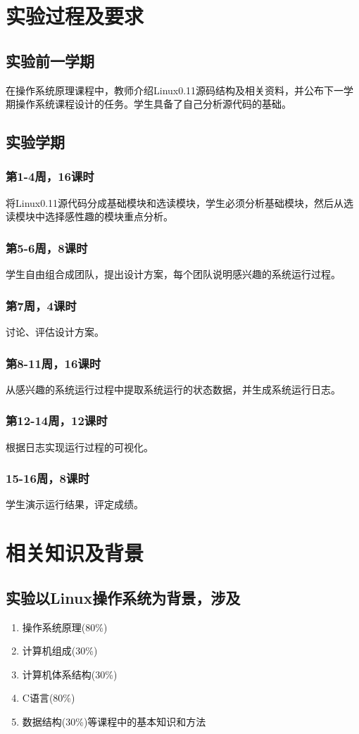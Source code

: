 \documentclass[]{report}
\begin{document}
\chapter{实验过程及要求}

\section{实验前一学期}

在操作系统原理课程中，教师介绍Linux0.11源码结构及相关资料，并公布下一学期操作系统课程设计的任务。学生具备了自己分析源代码的基础。

\section{实验学期}

\subsection{第1-4周，16课时}
将Linux0.11源代码分成基础模块和选读模块，学生必须分析基础模块，然后从选读模块中选择感性趣的模块重点分析。
\subsection{第5-6周，8课时}
学生自由组合成团队，提出设计方案，每个团队说明感兴趣的系统运行过程。
\subsection{第7周，4课时}
讨论、评估设计方案。
\subsection{第8-11周，16课时}
从感兴趣的系统运行过程中提取系统运行的状态数据，并生成系统运行日志。
\subsection{第12-14周，12课时}
根据日志实现运行过程的可视化。
\subsection{15-16周，8课时}
学生演示运行结果，评定成绩。

\chapter{相关知识及背景}

\section{实验以Linux操作系统为背景，涉及}
\begin{enumerate}[-]
    \item 操作系统原理(80\%)
    \item 计算机组成(30\%)
    \item 计算机体系结构(30\%)
    \item C语言(80\%)
    \item 数据结构(30\%)等课程中的基本知识和方法
\end{enumerate}
\end{document}
